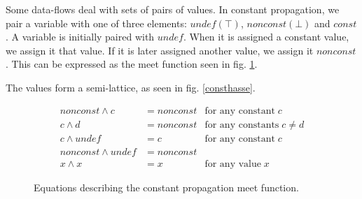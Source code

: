 \documentclass[bsc,twoside,singlespacing,parskip,logo,notimes,normalheadings]{infthesis}
\begin{document}
        Some data-flows deal with sets of pairs of values. In constant
        propagation, we pair a variable with one of three elements:
        $undef (\top)$, $nonconst (\bot)$ and $const$. A variable is
        initially paired with $undef$. When it is assigned a constant
        value, we assign it that value. If it is later assigned
        another value, we assign it $nonconst$. This can be expressed
        as the meet function seen in fig. \ref{constmeet}.
        
        The values form a semi-lattice, as seen in
        fig. \ref{consthasse}.

        \begin{figure}[h]
        \begin{align*}
        nonconst \land c &= nonconst & \text{for any constant} \; c \\
        c \land d &= nonconst &\text{for any constants} \; c \neq d \\
        c \land undef &= c &\text{for any constant} \; c \\
        nonconst \land undef &= nonconst & \\
        x \land x &= x &\text{for any value} \; x
        \end{align*}
        \caption{Equations describing the constant propagation meet function.}
        \label{constmeet}
        \end{figure}
        
\end{document}

